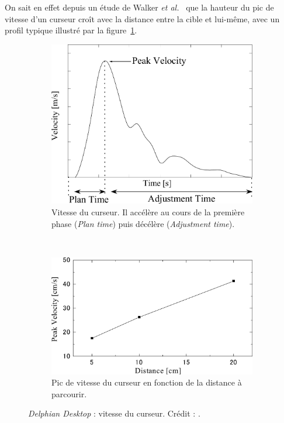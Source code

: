 	On sait en effet depuis un étude de Walker \emph{et al.}~\cite{walker1993spatial} que la hauteur du pic de vitesse d'un curseur croît avec la distance entre la cible et lui-même, avec un profil typique illustré par la figure~\ref{fig:delphianPeak}.

	\begin{figure}[!htb]
		\begin{subfigure}[t]{0.44\textwidth}
			\centering
			\includegraphics[width=\textwidth]{figures/ch2/delphianPeak}
			\caption{Vitesse du curseur. Il accélère au cours de la première phase (\emph{Plan time}) puis décélère (\emph{Adjustment time}).}
			\label{fig:delphianPeak}
		\end{subfigure}
		~
		\begin{subfigure}[t]{0.54\textwidth}
			\centering
			\includegraphics[width=\textwidth]{figures/ch2/delphianSpeedDist}
			\caption{Pic de vitesse du curseur en fonction de la distance à parcourir.}
			\label{fig:delphianSpeedDist}
		\end{subfigure}
		\caption[\emph{Delphian Desktop} : vitesse du curseur]{\emph{Delphian Desktop} : vitesse du curseur. Crédit : \cite{asano2005predictive}.}
		\label{fig:delphianCursor}
	\end{figure}
	
